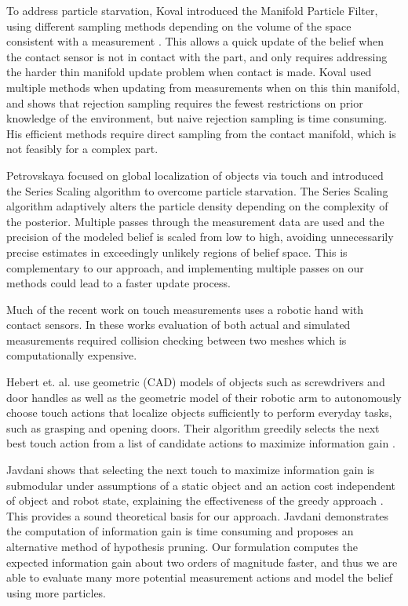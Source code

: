 \documentclass[../thesis.tex]{subfiles}
\begin{document}
To address particle starvation, Koval introduced the Manifold Particle Filter, using different sampling methods depending on the volume of the space consistent with a measurement \cite{Koval2011, Koval2013}. 
This allows a quick update of the belief when the contact sensor is not in contact with the part, and only requires addressing the harder thin manifold update problem when contact is made. 
Koval used multiple methods when updating from measurements when on this thin manifold, and shows that rejection sampling requires the fewest restrictions on prior knowledge of the environment, but naive rejection sampling is time consuming.
His efficient methods require direct sampling from the contact manifold, which is not feasibly for a complex part.

Petrovskaya focused on global localization of objects via touch \cite{Petrovskaya2011} and introduced the Series Scaling algorithm to overcome particle starvation. 
The Series Scaling algorithm adaptively alters the particle density depending on the complexity of the posterior. 
Multiple passes through the measurement data are used and the precision of the modeled belief is scaled from low to high, avoiding unnecessarily precise estimates in exceedingly unlikely regions of belief space. 
This is complementary to our approach, and implementing multiple passes on our methods could lead to a faster update process.

Much of the recent work on touch measurements uses a robotic hand with contact sensors. In these works evaluation of both actual and simulated measurements required collision checking between two meshes which is computationally expensive. 


Hebert et. al. use geometric (CAD) models of objects such as screwdrivers and door handles as well as the geometric model of their robotic arm to autonomously choose touch actions that localize objects sufficiently to perform everyday tasks, such as grasping and opening doors. 
Their algorithm greedily selects the next best touch action from a list of candidate actions to maximize information gain \cite{Hebert2013}.


Javdani shows that selecting the next touch to maximize information gain is submodular under assumptions of a static object and an action cost independent of object and robot state, explaining the effectiveness of the greedy approach \cite{Javdani2013}. 
This provides a sound theoretical basis for our approach.
Javdani demonstrates the computation of information gain is time consuming and proposes an alternative method of hypothesis pruning. 
Our formulation computes the expected information gain about two orders of magnitude faster, and thus we are able to evaluate many more potential measurement actions and model the belief using more particles.
\end{document}
